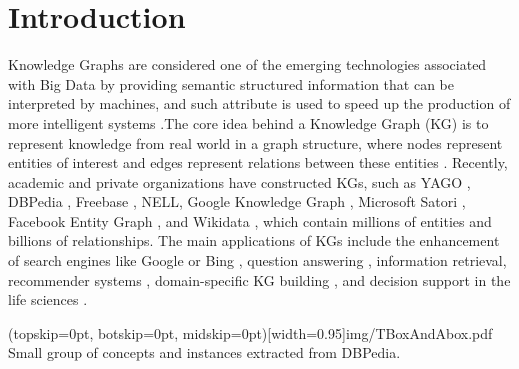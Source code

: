 \documentclass{ieeeaccess}
\begin{document}
\section{Introduction}
\label{sec:introduction}


Knowledge Graphs are considered one of the emerging technologies associated
with Big Data by providing semantic structured information that can be 
interpreted by machines, and such attribute is used to speed up the production
of more intelligent systems \cite{Zou_2020}.The core idea behind a Knowledge 
Graph (KG) is to represent knowledge from real world in a graph structure, 
where nodes represent entities of interest and edges represent relations 
between these entities \cite{Hogan21}. Recently, 
academic and private organizations have constructed KGs, such as YAGO 
\cite{suchanek2007yago}, DBPedia \cite{auer2007dbpedia}, Freebase 
\cite{Freebase08}, NELL\cite{NELL10}, Google Knowledge Graph 
\cite{GoogleKG12}, Microsoft Satori \cite{Satori13}, Facebook Entity
Graph \cite{Facebook13}, and Wikidata \cite{Wikidata14}, which contain
millions of entities and billions of relationships. The main applications 
of KGs include the enhancement of search engines like Google \cite{GoogleKG12}
or Bing \cite{Satori13}, question answering \cite{Chen2022}, information 
retrieval, recommender systems \cite{Lin2022, Haotian2022}, domain-specific KG 
building \cite{Zhang2022, Borrego2022, Guan2022}, and decision support in the 
life sciences \cite{Zou_2020,Belleau08,Ruttenberg09,Momtchev09}.


\Figure[h!](topskip=0pt, botskip=0pt, midskip=0pt)[width=0.95\textwidth]{img/TBoxAndAbox.pdf}
{Small group of concepts and instances extracted from DBPedia. \label{Fig:TboxAndAbox}}
\end{document}
